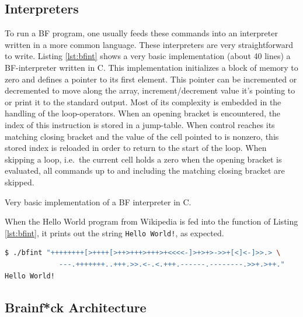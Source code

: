 \subsection{Interpreters}
To run a BF program, one usually feeds these commands into an interpreter written in a more common language. These interpreters are very straightforward to write. Listing \ref{lst:bfint} shows a very basic implementation (about 40 lines) a BF-interpreter written in C. This implementation initializes a block of memory to zero and defines a pointer to its first element. This pointer can be incremented or decremented to move along the array, increment/decrement value it's pointing to or print it to the standard output. Most of its complexity is embedded in the handling of the loop-operators. When an opening bracket is encountered, the index of this instruction is stored in a jump-table. When control reaches its matching closing bracket and the value of the cell pointed to is nonzero, this stored index is reloaded in order to return to the start of the loop. When skipping a loop, i.e.~the current cell holds a zero when the opening bracket is evaluated, all commands up to and including the matching closing bracket are skipped.

\begin{lstfloat}[H]
    
\caption{Very basic implementation of a BF interpreter in C.}
\label{lst:bfint}
\end{lstfloat}

When the Hello World program from Wikipedia \cite{bfwiki} is fed into the function of Listing \ref{lst:bfint}, it prints out the string \texttt{Hello World!}, as expected.
\vspace{0.5cm}
\begin{lstlisting}[language=bash]
  $ ./bfint "++++++++[>++++[>++>+++>+++>+<<<<-]>+>+>->>+[<]<-]>>.> \
             ---.+++++++..+++.>>.<-.<.+++.------.--------.>>+.>++."
Hello World!
\end{lstlisting}




\subsection{Brainf*ck Architecture}
